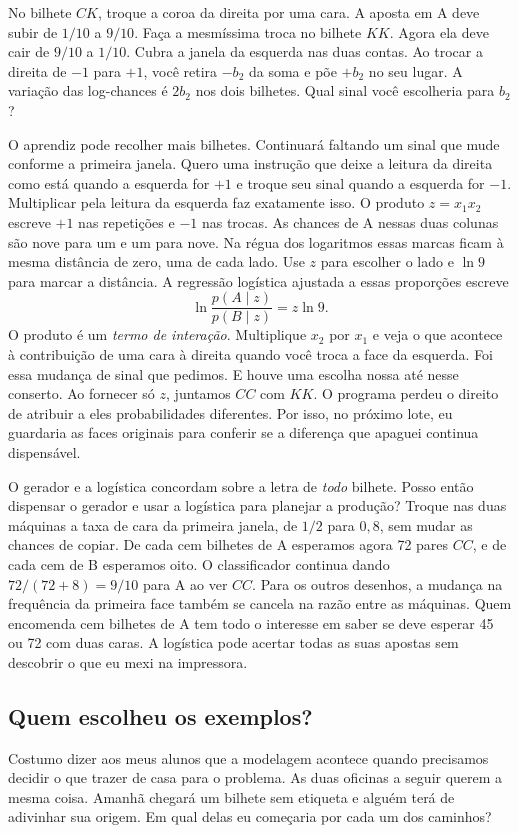 \documentclass[12pt,oneside]{article}
\newcommand{\secao}[1]{\Needspace{5.2\baselineskip}\subsection*{#1}}
\begin{document}
No bilhete $CK$, troque a coroa da direita por uma cara. A aposta em A deve subir de $1/10$ a $9/10$. Faça a mesmíssima troca no bilhete $KK$. Agora ela deve cair de $9/10$ a $1/10$. Cubra a janela da esquerda nas duas contas. Ao trocar a direita de $-1$ para $+1$, você retira $-b_2$ da soma e põe $+b_2$ no seu lugar. A variação das log-chances é $2b_2$ nos dois bilhetes. Qual sinal você escolheria para $b_2$?

O aprendiz pode recolher mais bilhetes. Continuará faltando um sinal que mude conforme a primeira janela. Quero uma instrução que deixe a leitura da direita como está quando a esquerda for $+1$ e troque seu sinal quando a esquerda for $-1$. Multiplicar pela leitura da esquerda faz exatamente isso. O produto $z=x_1x_2$ escreve $+1$ nas repetições e $-1$ nas trocas. As chances de A nessas duas colunas são nove para um e um para nove. Na régua dos logaritmos essas marcas ficam à mesma distância de zero, uma de cada lado. Use $z$ para escolher o lado e $\ln 9$ para marcar a distância. A regressão logística ajustada a essas proporções escreve
\[
              \ln\frac{p(A\mid z)}{p(B\mid z)}=z\ln 9 .
\]
O produto é um \emph{termo de interação}. Multiplique $x_2$ por $x_1$ e veja o que acontece à contribuição de uma cara à direita quando você troca a face da esquerda. Foi essa mudança de sinal que pedimos. E houve uma escolha nossa até nesse conserto. Ao fornecer só $z$, juntamos $CC$ com $KK$. O programa perdeu o direito de atribuir a eles probabilidades diferentes. Por isso, no próximo lote, eu guardaria as faces originais para conferir se a diferença que apaguei continua dispensável.

O gerador e a logística concordam sobre a letra de \emph{todo} bilhete. Posso então dispensar o gerador e usar a logística para planejar a produção? Troque nas duas máquinas a taxa de cara da primeira janela, de $1/2$ para $0{,}8$, sem mudar as chances de copiar. De cada cem bilhetes de A esperamos agora 72 pares $CC$, e de cada cem de B esperamos oito. O classificador continua dando $72/(72+8)=9/10$ para A ao ver $CC$. Para os outros desenhos, a mudança na frequência da primeira face também se cancela na razão entre as máquinas. Quem encomenda cem bilhetes de A tem todo o interesse em saber se deve esperar 45 ou 72 com duas caras. A logística pode acertar todas as suas apostas sem descobrir o que eu mexi na impressora.

\secao{Quem escolheu os exemplos?}
Costumo dizer aos meus alunos que a modelagem acontece quando precisamos decidir o que trazer de casa para o problema. As duas oficinas a seguir querem a mesma coisa. Amanhã chegará um bilhete sem etiqueta e alguém terá de adivinhar sua origem. Em qual delas eu começaria por cada um dos caminhos?
\end{document}
